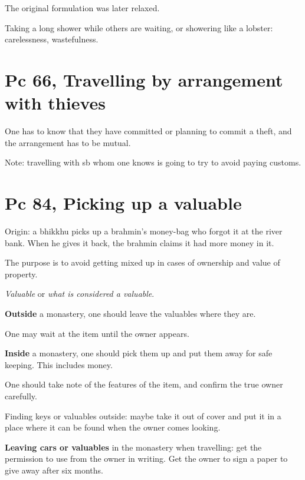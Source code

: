 The original formulation was later relaxed.

Taking a long shower while others are waiting, or showering like a
lobster: carelessness, wastefulness.

\section{Pc 66, Travelling by arrangement with thieves}

One has to know that they have committed or planning to commit a theft,
and the arrangement has to be mutual.

Note: travelling with sb whom one knows is going to try to avoid paying
customs.

\section{Pc 84, Picking up a valuable}

Origin: a bhikkhu picks up a brahmin's money-bag who forgot it at the
river bank. When he gives it back, the brahmin claims it had more money
in it.

The purpose is to avoid getting mixed up in cases of ownership and value
of property.

\emph{Valuable} or \emph{what is considered a valuable}.

\textbf{Outside} a monastery, one should leave the valuables where they
are.

One may wait at the item until the owner appears.

\textbf{Inside} a monastery, one should pick them up and put them away
for safe keeping. This includes money.

One should take note of the features of the item, and confirm the true
owner carefully.

Finding keys or valuables outside: maybe take it out of cover and put it
in a place where it can be found when the owner comes looking.

\textbf{Leaving cars or valuables} in the monastery when travelling: get
the permission to use from the owner in writing. Get the owner to sign a
paper to give away after six months.

